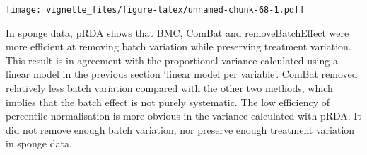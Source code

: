 \documentclass[]{book}
\newenvironment{Shaded}{\begin{snugshade}}{\end{snugshade}}
\newcommand{\KeywordTok}[1]{\textcolor[rgb]{0.13,0.29,0.53}{\textbf{#1}}}
\newcommand{\DataTypeTok}[1]{\textcolor[rgb]{0.13,0.29,0.53}{#1}}
\newcommand{\DecValTok}[1]{\textcolor[rgb]{0.00,0.00,0.81}{#1}}
\newcommand{\FloatTok}[1]{\textcolor[rgb]{0.00,0.00,0.81}{#1}}
\newcommand{\StringTok}[1]{\textcolor[rgb]{0.31,0.60,0.02}{#1}}
\newcommand{\OperatorTok}[1]{\textcolor[rgb]{0.81,0.36,0.00}{\textbf{#1}}}
\newcommand{\NormalTok}[1]{#1}
\begin{document}
\begin{Shaded}
\end{Shaded}

\texttt{[image: vignette\_files/figure-latex/unnamed-chunk-68-1.pdf]}

In sponge data, pRDA shows that BMC, ComBat and removeBatchEffect were
more efficient at removing batch variation while preserving treatment
variation. This result is in agreement with the proportional variance
calculated using a linear model in the previous section `linear model
per variable'. ComBat removed relatively less batch variation compared
with the other two methods, which implies that the batch effect is not
purely systematic. The low efficiency of percentile normalisation is
more obvious in the variance calculated with pRDA. It did not remove
enough batch variation, nor preserve enough treatment variation in
sponge data.
\end{document}
